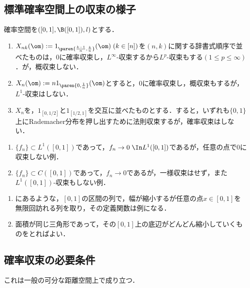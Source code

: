 \documentclass[uplatex,dvipdfmx]{jsreport}
\begin{document}
\subsection{標準確率空間上の収束の様子}

\begin{example}[反例]
    確率空間を$([0,1],\B([0,1]),l)$とする．
    \begin{enumerate}
        \item $X_{nk}(\om):=1_{\paren{\frac{k-1}{n},\frac{k}{n}}}(\om)\;(k\in[n])$を$(n,k)$に関する辞書式順序で並べたものは，$0$に確率収束し，$L^\infty$-収束するから$L^p$-収束もする$(1\le p\le\infty)$．が，概収束しない．
        \item $X_{n}(\om):=n1_{\paren{0,\frac{1}{n}}}(\om)$とすると，$0$に確率収束し，概収束もするが，$L^1$-収束はしない．
        \item $X_n$を，$1_{[0,1/2]}$と$1_{[1/2,1]}$を交互に並べたものとする．すると，いずれも$\{0,1\}$上にRademacher分布を押し出すために法則収束するが，確率収束はしない．
    \end{enumerate}
\end{example}

\begin{example}\mbox{}
    \begin{enumerate}
        \item $\{f_n\}\subset L^1([0,1])$であって，$f_n\to0\;\In L^1([0,1])$であるが，任意の点で$0$に収束しない例．
        \item $\{f_n\}\subset C([0,1])$であって，$f_n\to0$であるが，一様収束はせず，また$L^1([0,1])$-収束もしない例．
    \end{enumerate}
\end{example}
\begin{Proof}\mbox{}
    \begin{enumerate}
        \item \cite{伊藤清確率論}にあるような，$[0,1]$の区間の列で，幅が縮小するが任意の点$x\in[0,1]$を無限回訪れる列を取り，その定義関数は例になる．
        \item 面積が同じ三角形であって，その$[0,1]$上の底辺がどんどん縮小していくものをとればよい．
    \end{enumerate}
\end{Proof}

\subsection{確率収束の必要条件}

\begin{tcolorbox}[colframe=ForestGreen, colback=ForestGreen!10!white,breakable,colbacktitle=ForestGreen!40!white,coltitle=black,fonttitle=\bfseries\sffamily,
title=]
    これは一般の可分な距離空間上で成り立つ．
\end{tcolorbox}
\end{document}
